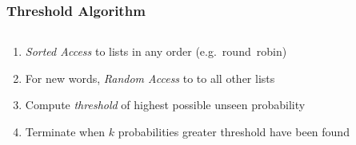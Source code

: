 \documentclass{presentation}
\begin{document}
\begin{frame}
  \frametitle{Threshold Algorithm}

  \begin{columns}[T]
    \begin{column}{.4\textwidth}
      \begin{enumerate}
        \item<3-> \alert< 9,13,17,19,23>{\emph{Sorted Access} to lists in any order (e.g.~round~robin)}
        \vspace{0.1cm}
        \item<4-> \alert<10,14,20>{For new words, \emph{Random Access} to to all other lists}
        \vspace{0.1cm}
        \item<5-> \alert<12,16,18,22,24>{Compute \emph{threshold} of highest possible unseen probability}
        \vspace{0.1cm}
        \item<6-> \alert<25>{Terminate when $k$ probabilities greater threshold have been found}
      \end{enumerate}
    \end{column}
    \begin{column}{.6\textwidth}
      \vspace{-0.25cm}
\end{column}
\end{columns}
\end{frame}
\end{document}
